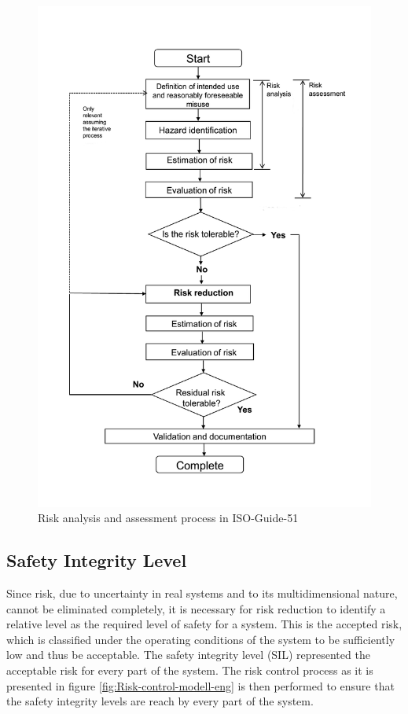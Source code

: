\documentclass{template/openetcs_report}
\begin{document}
\begin{figure}[htbp]
\centering
\includegraphics[width=0.6\linewidth]{ISO-Guide-51-risk-analysis-and-assessment}
\caption{Risk analysis and assessment process in ISO-Guide-51}
\label{fig:risk-analysis}
\end{figure}

\subsection{Safety Integrity Level}

Since risk, due to  uncertainty in real systems and to its multidimensional nature, cannot be eliminated completely, it is necessary for risk reduction to identify a relative level  as the required level of safety for a system. This is the accepted risk, which is classified under the operating conditions of the system to be sufficiently low and thus be acceptable. The safety integrity level (SIL) represented the acceptable risk for every part of the system. The risk control process as it is presented in figure \ref{fig:Risk-control-modell-eng} is then performed to ensure that the safety integrity levels are reach by every part of the system.
\end{document}
